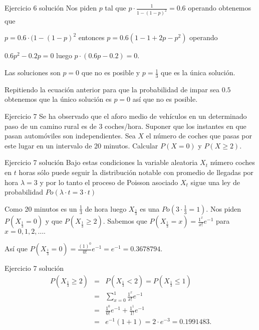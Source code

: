 \documentclass[
  ignorenonframetext,
]{beamer}
\begin{document}
\begin{frame}{Ejercicio 6 solución}
\protect\hypertarget{ejercicio-6-soluciuxf3n-1}{}
Nos piden \(p\) tal que \(p\cdot \frac{1}{1-(1-p)^2}=0.6\) operando
obtenemos que

\(p=0.6\cdot (1-(1-p)^2\) entonces \(p=0.6\left(1-1+2 p-p^2\right)\)
operando

\(0.6 p^2-0.2 p=0\) luego \(p \cdot (0.6 p -0.2)=0\).

Las soluciones son \(p=0\) que no es posible y \(p=\frac{1}{3}\) que es
la única solución.

Repitiendo la ecuación anterior para que la probabilidad de impar sea
\(0.5\) obtenemos que la único solución es \(p=0\) así que no es
posible.
\end{frame}

\begin{frame}{Ejercicio 7}
\protect\hypertarget{ejercicio-7}{}
Se ha observado que el aforo medio de vehículos en un determinado paso
de un camino rural es de 3 coches/hora. Suponer que los instantes en que
pasan automóviles son independientes. Sea \(X\) el número de coches que
pasas por este lugar en un intervalo de 20 minutos. Calcular \(P(X=0)\)
y \(P(X\geq 2)\).
\end{frame}

\begin{frame}{Ejercicio 7 solución}
\protect\hypertarget{ejercicio-7-soluciuxf3n}{}
Bajo estas condiciones la variable aleatoria \(X_t\) número coches en
\(t\) horas sólo puede seguir la distribución notable con promedio de
llegadas por hora \(\lambda=3\) y por lo tanto el proceso de Poisson
asociado \(X_t\) sigue una ley de probabilidad
\(Po(\lambda \cdot t =3\cdot t)\)

Como 20 minutos es un \(\frac13\) de hora luego \(X_{\frac13}\) es una
\(Po(3\cdot \frac13=1)\). Nos piden \(P(X_{\frac13}=0)\) y que
\(P\left(X_{\frac{1}{3}}\geq 2 \right)\). Sabemos que
\(P(X_{\frac13}=x)=\frac{1^x}{x!} e^{-1}\) para \(x=0,1,2,\ldots.\)

Así que \(P(X_{\frac13}=0)=\frac{(1)^0}{0!} e^{-1}=e^{-1}=0.3678794.\)
\end{frame}

\begin{frame}{Ejercicio 7 solución}
\protect\hypertarget{ejercicio-7-soluciuxf3n-1}{}
\[
\begin{array}{lll}
P\left(X_{\frac13}\geq 2 \right)&=&P\left(X_{\frac13}< 2 \right)=P\left(X_{\frac13}\leq 1\right)\\
&=&
\sum_{x=0}^1 \frac{1^x}{x!} e^{-1}
\\
&=&
\frac{1^0}{0!} e^{-1}+\frac{1^1}{1!} e^{-1}\\
&=&
e^{-1}\left(1+1\right)=2\cdot e^{-3}=0.1991483.
\end{array}
\]
\end{frame}
\end{document}

